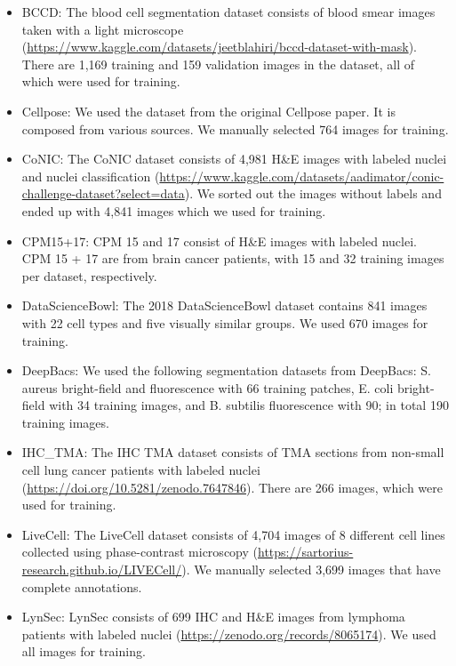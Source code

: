 \begin{itemize}
  \item BCCD: The blood cell segmentation dataset consists of blood smear images taken with a light microscope 
  (\url{https://www.kaggle.com/datasets/jeetblahiri/bccd-dataset-with-mask}). 
  There are 1,169 training and 159 validation images in the dataset, all of which were used for training.

  \item Cellpose: We used the dataset from the original Cellpose paper. It is composed from various sources. We manually selected 764 images for training.

  \item CoNIC: The CoNIC dataset consists of 4,981 H\&E images with labeled nuclei and nuclei classification 
  (\url{https://www.kaggle.com/datasets/aadimator/conic-challenge-dataset?select=data}). 
  We sorted out the images without labels and ended up with 4,841 images which we used for training.

  \item CPM15+17: CPM 15 and 17 consist of H\&E images with labeled nuclei. CPM 15 + 17 are from brain cancer patients, with 15 and 32 training images per dataset, respectively.

  \item DataScienceBowl: The 2018 DataScienceBowl dataset contains 841 images with 22 cell types and five visually similar groups. We used 670 images for training.

  \item DeepBacs: We used the following segmentation datasets from DeepBacs: S. aureus bright-field and fluorescence with 66 training patches, E. coli bright-field with 34 training images, and B. subtilis fluorescence with 90; in total 190 training images.

  \item IHC\_TMA: The IHC TMA dataset consists of TMA sections from non-small cell lung cancer patients with labeled nuclei 
  (\url{https://doi.org/10.5281/zenodo.7647846}). 
  There are 266 images, which were used for training.

  \item LiveCell: The LiveCell dataset consists of 4,704 images of 8 different cell lines collected using phase-contrast microscopy 
  (\url{https://sartorius-research.github.io/LIVECell/}). 
  We manually selected 3,699 images that have complete annotations.

  \item LynSec: LynSec consists of 699 IHC and H\&E images from lymphoma patients with labeled nuclei 
  (\url{https://zenodo.org/records/8065174}). 
  We used all images for training.


\end{itemize}
